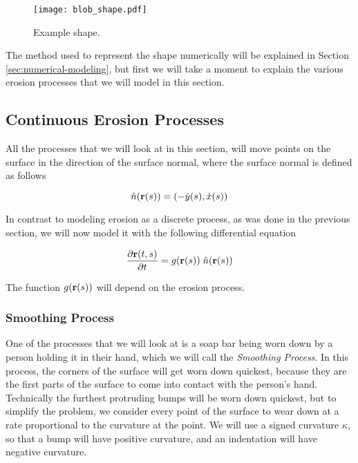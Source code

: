 \begin{figure}[h!]
  \begin{center}
    \texttt{[image: blob\_shape.pdf]}
  \end{center}
  \vspace{-.2in} %
  \caption{\label{fig:blob-shape} Example shape.}
\end{figure}

The method used to represent the shape numerically will be explained in Section \ref{sec:numerical-modeling}, but first we will take a moment to explain the various erosion processes that we will model in this section.

\subsection*{Continuous Erosion Processes}

All the processes that we will look at in this section, will move points on the surface in the direction of the surface normal, where the surface normal is defined as follows

\[
  \hat{n}(\mathbf{r}(s)) = (-\dot{y}(s), \dot{x}(s))
\]

In contrast to modeling erosion as a discrete process, as was done in the previous section, we will now model it with the following differential equation

\begin{equation}
  \label{eq:erosion-diff-eq}
  \frac{\partial \mathbf{r}(t, s)}{\partial t} = g(\mathbf{r}(s)) \; \hat{n}(\mathbf{r}(s))
\end{equation}

The function $g(\mathbf{r}(s))$ will depend on the erosion process.

\subsubsection*{Smoothing Process}

One of the processes that we will look at is a soap bar being worn down by a person holding it in their hand, which we will call the \textit{Smoothing Process}. In this process, the corners of the surface will get worn down quickest, because they are the first parts of the surface to come into contact with the person's hand. Technically the furthest protruding bumps will be worn down quickest, but to simplify the problem, we consider every point of the surface to wear down at a rate proportional to the curvature at the point. We will use a signed curvature $\kappa$, so that a bump will have positive curvature, and an indentation will have negative curvature. 

